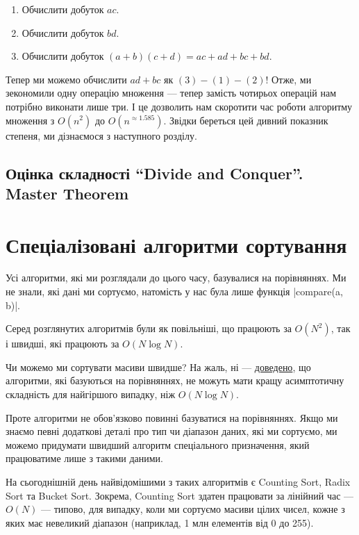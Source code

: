 \documentclass[12pt,a4paper]{report}
\begin{document}
\begin{enumerate}
    \item Обчислити добуток \(ac\).
    \item Обчислити добуток \(bd\).
    \item Обчислити добуток \((a + b)(c + d) = ac + ad + bc + bd\).
\end{enumerate}

Тепер ми можемо обчислити \(ad + bc\) як \((3) - (1) - (2)\)!
Отже, ми зекономили одну операцію множення --- тепер замість чотирьох операцій нам потрібно виконати лише три. І це дозволить нам скоротити час роботи алгоритму множення з \(O(n ^ 2)\) до \(O(n ^ {\approx 1.585})\). Звідки береться цей дивний показник степеня, ми дізнаємося з наступного розділу.


\subsection{Оцінка складності ``Divide and Conquer''. Master Theorem}



\section{Спеціалізовані алгоритми сортування}

Усі алгоритми, які ми розглядали до цього часу, базувалися на порівняннях. Ми не знали, які дані ми сортуємо, натомість у нас була лише функція |compare(a, b)|.

Серед розглянутих алгоритмів були як повільніші, що працюють за \(O(N^2)\), так і швидші, які працюють за \(O(N \log N)\).

Чи можемо ми сортувати масиви швидше? На жаль, ні --- \href{http://www.bowdoin.edu/~ltoma/teaching/cs231/fall07/Lectures/sortLB.pdf}{доведено}, що алгоритми, які базуються на порівняннях, не можуть мати кращу асимптотичну складність для найгіршого випадку, ніж \(O(N \log N)\).

Проте алгоритми не обов’язково повинні базуватися на порівняннях. Якщо ми знаємо певні додаткові деталі про тип чи діапазон даних, які ми сортуємо, ми можемо придумати швидший алгоритм спеціального призначення, який працюватиме лише з такими даними.

На сьогоднішній день найвідомішими з таких алгоритмів є Counting Sort, Radix Sort та Bucket Sort. Зокрема, Counting Sort здатен працювати за лінійний час --- \(O(N)\) --- типово, для випадку, коли ми сортуємо масиви цілих чисел, кожне з яких має невеликий діапазон (наприклад, 1 млн елементів від 0 до 255).
\end{document}
